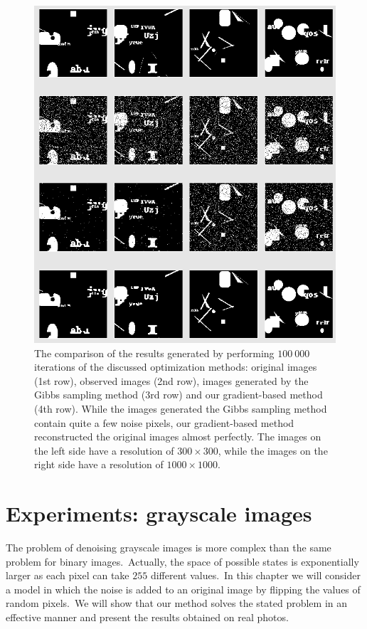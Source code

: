 \documentclass[a4paper, 11pt, onecolumn, openany, titlepage]{report}
\newcommand\numberedchapter[1]{\setlength\topskip{3cm}\chapter{#1}\setlength\topskip{0cm}}
\theoremstyle{default_theorem_style}\newtheorem{theorem}{Theorem}
\theoremstyle{default_theorem_style}\newtheorem{definition}{Definition}
\begin{document}
\begin{figure}[H]
\centering
\includegraphics[scale=0.52]{binary_qualitative_results}
\caption{The comparison of the results generated by performing $100\ 000$ iterations of the discussed optimization
methods: original images (1st row), observed images (2nd row), images generated by the Gibbs
sampling method (3rd row) and our gradient-based method (4th row). While the images generated the Gibbs sampling
method contain quite a few noise pixels, our gradient-based method reconstructed the original images almost
perfectly. The images on the left side have a resolution of $300{\times}300$, while the images on the right side
have a resolution of $1000{\times}1000$.}
\label{fig:binary_qualitative_results}
\end{figure}

\numberedchapter{Experiments: grayscale images}\label{chapter:grayscale_experiments}

The problem of denoising grayscale images is more complex than the same problem for binary
images.\ Actually, the space of possible states is exponentially larger as each pixel can take $255$ different
values.\ In this chapter we will consider a model in which the noise is added to an original image by flipping
the values of random pixels.\ We will show that our method solves the stated problem in an effective manner
and present the results obtained on real photos.
\end{document}
